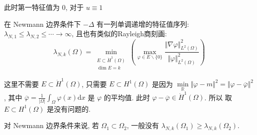 \documentclass[11pt]{ctexart}[UTF8]
\begin{document}
此时第一特征值为 $0$, 对于 $u \equiv 1$\par
在 Newmann 边界条件下 $-\Delta$ 有一列单调递增的特征值序列: $\lambda_{N,1} \leq \lambda_{N,2} \leq \cdots \rightarrow \infty$, 且也有类似的Rayleigh商刻画:
\begin{equation*}
    \lambda_{N,k}(\Omega) = \min\limits_{\substack{E \subset \dot{H}^1(\Omega)\\ \dim E = k}} \left( \max\limits_{\varphi \in E\backslash\{0\}} \frac{\Vert \nabla \varphi \Vert_{L^2(\Omega)}^2}{\Vert \varphi \Vert_{L^2(\Omega)}^2} \right)
\end{equation*}
\begin{remark}
    这里不需要 $E \subset \dot{H}^1(\Omega)$, 只需要 $E \subset H^1(\Omega)$ 是因为 $\min\limits_{\mathbb{R}}\Vert \varphi - m\Vert^{2} = \Vert \varphi - \overline{\varphi} \Vert^{2}$, 
    其中 $\overline{\varphi} = \frac{1}{|\Omega|} \int_{\Omega} \varphi(x) \mathrm{d}x$ 是 $\varphi$ 的平均值. 此时 $\varphi - \overline{\varphi} \in \dot{H}^1(\Omega)$. 所以
    取 $E \subset H^1(\Omega)$ 是没有问题的.
\end{remark}
\begin{remark}
    对 Newmann 边界条件来说, 若 $\Omega_{1} \subset \Omega_{2}$, 一般没有 $\lambda_{N,k}(\Omega_{1}) \geq \lambda_{N,k}(\Omega_{2})$.
\end{remark}
\end{document}
